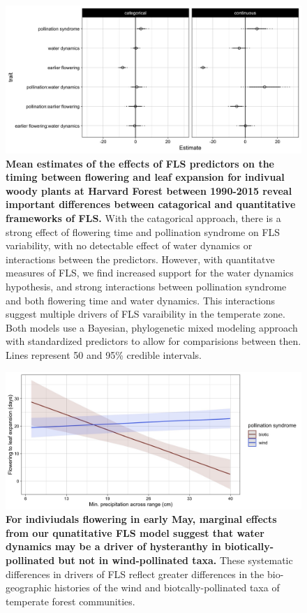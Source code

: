 \documentclass{article}
\begin{document}
 \begin{figure}[h!]
        \centering
          \includegraphics[width=\textwidth]{..//HF.jpeg}
          \caption{\textbf{Mean estimates of the effects of FLS predictors on the timing between flowering and leaf expansion for indivual woody plants at Harvard Forest between 1990-2015 reveal important differences between catagorical and quantitative frameworks of FLS.}  With the catagorical approach, there is a strong effect of flowering time and pollination syndrome on FLS variability, with no detectable effect of water dynamics or interactions between the predictors. However, with quantitatve measures of FLS, we find increased support for the water dynamics hypothesis, and strong interactions between pollination syndrome and both flowering time and water dynamics. This interactions suggest multiple drivers of FLS varaibility in the temperate zone.  Both models use a Bayesian, phylogenetic mixed modeling approach with standardized predictors to allow for comparisions between then.  Lines represent 50 and 95\% credible intervals.}  
        \label{fig:muplots.HF}
    \end{figure}    

    

 \begin{figure}[h!]
        \centering
          \includegraphics[width=\textwidth]{..//HarvardForest/apcs.jpeg}
           \caption{\textbf{ For indiviudals flowering in early May, marginal effects from our qunatitative FLS model suggest that water dynamics may be a driver of hysteranthy in biotically-pollinated but not in wind-pollinated taxa.}  These systematic differences in drivers of FLS reflect greater differences in the bio-geographic histories of the wind and biotcally-pollinated taxa of temperate forest communities.}
        \label{fig:apcs}
    \end{figure}
 

    
\end{document}
